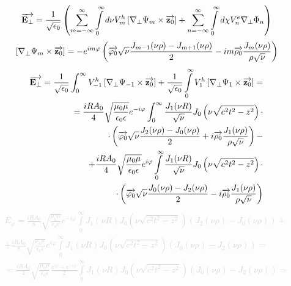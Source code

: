 \textcolor{lightgray} { \begin{equation*} \begin{aligned}
\overrightarrow{\mathbf E_\perp} = \frac{1}{\sqrt{\epsilon_0}} \left( 
\sum \limits_{m=-\infty}^{\infty} \int \limits_{0}^{\infty} 
d \nu V_m^h \left[  \nabla_\perp \Psi_m  \times  \overrightarrow{\mathbf z_0}  \right] +
\sum \limits_{n=-\infty}^{\infty} \int \limits_{0}^{\infty}
d \chi V_n^e \nabla_\perp \Phi_n \right)
\end{aligned} \end{equation*} }
%
\textcolor{lightgray} { \begin{equation*} \begin{aligned}
\left[  \nabla_\perp \Psi_m  \times  \overrightarrow{\mathbf z_0}  \right] = 
- e^{im\varphi} \left( \overrightarrow{\mathbf \varphi_0} \sqrt{\nu} 
\frac{J_{m-1} (\nu \rho) - J_{m+1} (\nu \rho)}{2} - 
i m \overrightarrow{\mathbf \rho_0} \frac{J_m (\nu \rho)}{ \rho \sqrt{\nu}} \right)
\end{aligned} \end{equation*} }
%
\textcolor{lightgray} { \begin{equation*} \begin{aligned}
\overrightarrow{\mathbf E_\perp} = \frac{1}{\sqrt{\epsilon_0}} \int_{0}^{\infty} 
V_{-1}^h \left[  \nabla_\perp \Psi_{-1}   \times  \overrightarrow{\mathbf z_0}  \right] +
\frac{1}{\sqrt{\epsilon_0}} \int \limits_{0}^{\infty} 
V_{1}^h \left[  \nabla_\perp \Psi_{1}  \times  \overrightarrow{\mathbf z_0}  \right] = \\
= \frac{i R A_0}{4} \sqrt{\frac{\mu_0 \mu}{\epsilon_0 \epsilon}} 
e^{- i \varphi} \int_{0}^{\infty} \frac{J_1 (\nu R)}{\sqrt{\nu}} 
J_0 \left( \nu \sqrt{c^2 t^2 - z^2} \right) \cdot \\
\cdot \left( \overrightarrow{\mathbf \varphi_0} \sqrt{\nu} 
\frac{J_2 (\nu \rho) - J_0 (\nu \rho)}{2} +
i \overrightarrow{\mathbf \rho_0} \frac{J_1 (\nu \rho)}{ \rho \sqrt{\nu}} \right) - \\
+ \frac{i R A_0}{4} \sqrt{\frac{\mu_0 \mu}{\epsilon_0 \epsilon}}
e^{i \varphi} \int \limits_{0}^{\infty} \frac{J_1 (\nu R)}{ \sqrt{\nu}}
J_0 \left( \nu \sqrt{c^2 t^2 - z^2} \right) \cdot \\
\cdot \left( \overrightarrow{\mathbf \varphi_0} \sqrt{\nu}
\frac{J_0 (\nu \rho) - J_2 (\nu \rho)}{2} - 
i \overrightarrow{\mathbf \rho_0} \frac{J_1 (\nu \rho)}{ \rho \sqrt{\nu}} \right)
\end{aligned} \end{equation*} }
%
\textcolor{lightgray} { \begin{equation*} \begin{aligned}
E_\varphi = \frac{i R A_0}{8} \sqrt{\frac{\mu_0 \mu}{\epsilon_0 \epsilon}} 
e^{-i \varphi} \int \limits_{0}^{\infty} J_1 (\nu R)
J_0 \left( \nu \sqrt{c^2 t^2 - z^2} \right)
\left( J_2 (\nu \rho) - J_0 (\nu \rho) \right) + \\
+ \frac{i R A_0}{8} \sqrt{\frac{\mu_0 \mu}{\epsilon_0 \epsilon}} 
e^{i \varphi} \int \limits_{0}^{\infty} J_1 (\nu R)
J_0 \left( \nu \sqrt{c^2 t^2 - z^2} \right)
\left( J_0 (\nu \rho) - J_2 (\nu \rho) \right) = \\
= \frac{i R A_0}{4} \sqrt{\frac{\mu_0 \mu}{\epsilon_0 \epsilon}}
\frac{e^{i \varphi} - e^{-i \varphi} }{2} \int \limits_{0}^{\infty} 
J_1 (\nu R) J_0 \left( \nu \sqrt{c^2 t^2 - z^2} \right) 
\left( J_0 (\nu \rho) - J_2 (\nu \rho) \right) =
\end{aligned} \end{equation*} }
